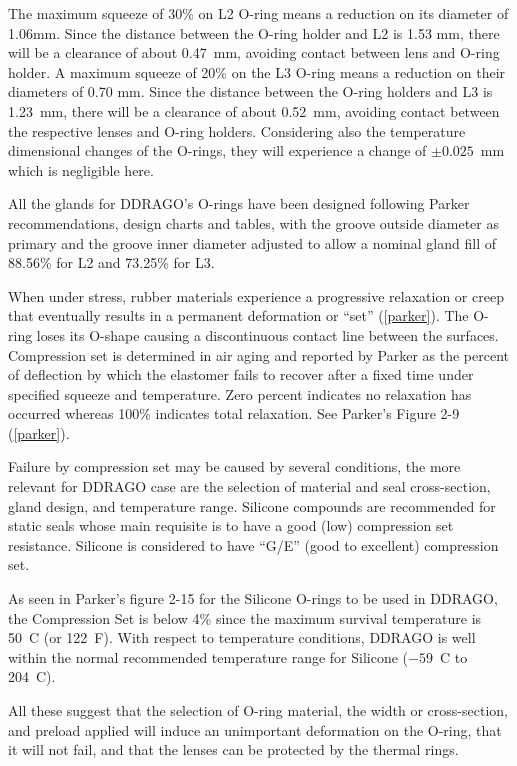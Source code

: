 \documentclass{article}
\begin{document}
The maximum squeeze of 30\% on L2 O-ring means a reduction on its diameter of 1.06mm. Since the
distance between the O-ring holder and L2 is 1.53 mm, there will be a clearance of about 0.47~mm, avoiding contact between lens and O-ring holder. A maximum squeeze of 20\% on the L3 O-ring means a reduction on their diameters of 0.70 mm. Since the distance between the O-ring holders and L3 is 1.23~mm, there will be a clearance of about 0.52~mm, avoiding contact between the respective lenses and O-ring holders. Considering also the temperature dimensional changes of the O-rings, they will experience a change of $\pm0.025$~mm which is negligible here.

All the glands for DDRAGO’s O-rings have been designed following Parker recommendations, design charts and tables, with the groove outside diameter as primary and the groove inner diameter adjusted to allow a nominal gland fill of 88.56\% for L2 and 73.25\% for L3.

When under stress, rubber materials experience a progressive relaxation or creep that eventually results in a permanent deformation or “set” (\ref{parker}). The O-ring loses its O-shape causing a discontinuous contact line between the surfaces. Compression set is determined in air aging and reported by Parker as the percent of deflection by which the elastomer fails to recover after a fixed time under specified squeeze and temperature. Zero percent indicates no relaxation has occurred whereas 100\% indicates total relaxation. See Parker’s Figure 2-9 (\ref{parker}).

Failure by compression set may be caused by several conditions, the more relevant for DDRAGO case are the selection of material and seal cross-section, gland design, and temperature range.
Silicone compounds are recommended for static seals whose main requisite is to have a good (low) compression set resistance. Silicone is considered to have “G/E” (good to excellent) compression set. 

As seen in Parker’s figure 2-15 for the Silicone O-rings to be used in DDRAGO, the Compression Set is below 4\% since the maximum survival temperature is 50~C (or 122~F). With respect to temperature conditions, DDRAGO is well within the normal recommended temperature range for Silicone ($-59$~C to 204~C).

All these suggest that the selection of O-ring material, the width or cross-section, and preload applied will induce an unimportant deformation on the O-ring, that it will not fail, and that the lenses can be protected by the thermal rings.
\end{document}
